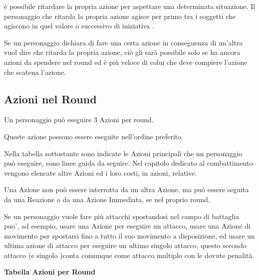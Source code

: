 \documentclass[a4paper,11pt,twoside,openany]{book}
\begin{document}
è possibile ritardare la propria azione per aspettare una determinata situazione. Il personaggio che ritarda la propria azione agisce per primo tra i soggetti che agiscono in quel valore o successivo di iniziativa .

Se un personaggio dichiara di fare una certa azione in conseguenza di un'altra vuol dire che ritarda la propria azione, ciò gli sarà possibile solo se ha ancora azioni da spendere nel round ed è più veloce di colui che deve compiere l'azione che scatena l'azione.

\subsection{Azioni nel Round}

\label{azioni-nel-round}

Un personaggio può eseguire 3 Azioni per round.

Queste azione possono essere eseguite nell'ordine preferito.

Nella tabella sottostante sono indicate le Azioni principali che un personaggio può eseguire, sono linee guida da seguire. Nel capitolo dedicato al combattimento vengono elencate altre Azioni ed i loro costi, in azioni, relative.

Una Azione non può essere interrotta da un altra Azione, ma può essere seguita da una Reazione o da una Azione Immediata, se nel proprio round.

Se un personaggio vuole fare più attacchi spostandosi nel campo di battaglia puo', ad esempio, usare una Azione per eseguire un attacco, usare una Azione di movimento per spostarsi fino a tutto il suo movimento a disposizione, ed usare un ultima azione di attacco per eseguire un ultimo singolo attacco, questo secondo attacco (e singolo )conta comunque come attacco multiplo con le dovute penalità.

\medskip

\textbf{Tabella Azioni per Round}

\medskip
\end{document}
